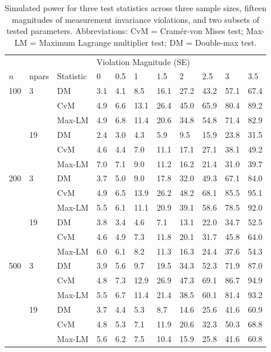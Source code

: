 \documentclass[man]{apa}
\begin{document}
\begin{table}
\caption{Simulated power for three test statistics
  across three sample sizes, fifteen magnitudes of measurement
  invariance violations, and two subsets of tested
  parameters. Abbreviations: CvM = Cram\'{e}r-von Mises 
  test; Max-LM = Maximum Lagrange multiplier test; DM = Double-max test.}
\label{tab:simres}
\begin{center}
\begin{tabular}{lllllllllll}
  \hline
   & & & \multicolumn{8}{l}{Violation Magnitude (SE)} \\
  $n$ &  npars &  Statistic    &  0 & 0.5 &    1 &  1.5
       &    2 &  2.5  &   3 &  3.5 \\ 
  \hline
100 & 3 & DM & 3.1 & 4.1 & 8.5 & 16.1 & 27.2 & 43.2 & 57.1 & 67.4 \\ 
   &  & CvM & 4.9 & 6.6 & 13.1 & 26.4 & 45.0 & 65.9 & 80.4 & 89.2 \\ 
   &  & Max-LM & 4.9 & 6.8 & 11.4 & 20.6 & 34.8 & 54.8 & 71.4 & 82.9 \\ 
   & 19 & DM & 2.4 & 3.0 & 4.3 & 5.9 & 9.5 & 15.9 & 23.8 & 31.5 \\ 
   &  & CvM & 4.6 & 4.4 & 7.0 & 11.1 & 17.1 & 27.1 & 38.1 & 49.2 \\ 
   &  & Max-LM & 7.0 & 7.1 & 9.0 & 11.2 & 16.2 & 21.4 & 31.0 & 39.7 \\ 
  200 & 3 & DM & 3.7 & 5.0 & 9.0 & 17.8 & 32.0 & 49.3 & 67.1 & 84.0 \\ 
   &  & CvM & 4.9 & 6.5 & 13.9 & 26.2 & 48.2 & 68.1 & 85.5 & 95.1 \\ 
   &  & Max-LM & 5.5 & 6.1 & 11.1 & 20.9 & 39.1 & 58.6 & 78.5 & 92.0 \\ 
   & 19 & DM & 3.8 & 3.4 & 4.6 & 7.1 & 13.1 & 22.0 & 34.7 & 52.5 \\ 
   &  & CvM & 4.6 & 4.9 & 7.3 & 11.8 & 20.1 & 31.7 & 45.8 & 64.0 \\ 
   &  & Max-LM & 6.0 & 6.1 & 8.2 & 11.3 & 16.3 & 24.4 & 37.6 & 54.3 \\ 
  500 & 3 & DM & 3.9 & 5.6 & 9.7 & 19.5 & 34.3 & 52.3 & 71.9 & 87.0 \\ 
   &  & CvM & 4.8 & 7.3 & 12.9 & 26.9 & 47.3 & 69.1 & 86.7 & 94.9 \\ 
   &  & Max-LM & 5.5 & 6.7 & 11.4 & 21.4 & 38.5 & 60.1 & 81.4 & 93.2 \\ 
   & 19 & DM & 3.7 & 4.4 & 5.3 & 8.7 & 14.6 & 25.6 & 41.6 & 60.9 \\ 
   &  & CvM & 4.8 & 5.3 & 7.1 & 11.9 & 20.6 & 32.3 & 50.3 & 68.8 \\ 
   &  & Max-LM & 5.6 & 6.2 & 7.5 & 10.4 & 15.9 & 25.8 & 41.6 & 60.8 \\ 
   \hline
\end{tabular}
\end{center}
\end{table}
\end{document}

